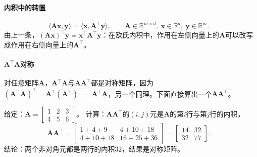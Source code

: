 \paragraph{内积中的转置}
\[
 \langle\bm A\bm x,\bm y\rangle=\langle\bm x,\bm A^\top\bm y\rangle,\qquad\bm A\in\mathbb R^{m\times d},\ \bm x\in\mathbb R^d,\ \bm y\in\mathbb R^m.
\]
由上一条，$(\bm A\bm x)^\top\bm y=\bm x^\top\bm A^\top\bm y$：在欧氏内积中，作用在左侧向量上的$\bm A$可以改写成作用在右侧向量上的$\bm A^\top$。

\paragraph{$\bm A^\top\bm A$对称}
对任意矩阵$\bm A$，$\bm A^\top\bm A$与$\bm A\bm A^\top$都是对称矩阵，因为$(\bm A^\top\bm A)^\top=\bm A^\top(\bm A^\top)^\top=\bm A^\top\bm A$，另一个同理。下面直接算出一个$\bm A\bm A^\top$。
\begin{example}[计算$\bm A\bm A^\top$]
\label{ex:ls-gram-product-symmetric}
给定：$\bm A=\left[\begin{smallmatrix}1&2&3\\4&5&6\end{smallmatrix}\right]$。
计算：$\bm A\bm A^\top$的$(i,j)$元是$\bm A$的第$i$行与第$j$行的内积，
\[
 \bm A\bm A^\top=\begin{bmatrix}1+4+9&4+10+18\\4+10+18&16+25+36\end{bmatrix}=\begin{bmatrix}14&32\\32&77\end{bmatrix}.
\]
结论：两个非对角元都是两行的内积$32$，结果是对称矩阵。
\end{example}

